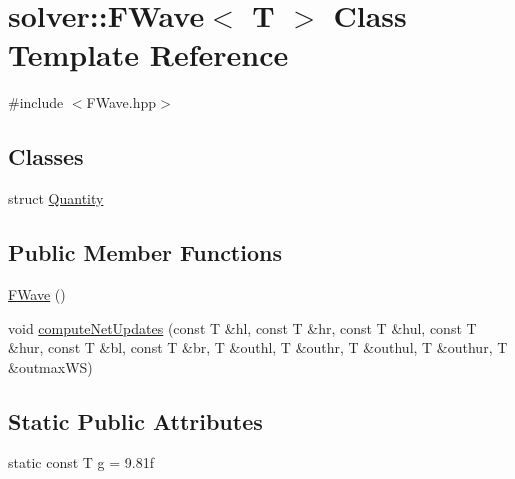\hypertarget{classsolver_1_1FWave}{}\section{solver\+:\+:F\+Wave$<$ T $>$ Class Template Reference}
\label{classsolver_1_1FWave}


{\ttfamily \#include $<$F\+Wave.\+hpp$>$}

\subsection*{Classes}
\begin{DoxyCompactItemize}
\item 
struct \hyperlink{structsolver_1_1FWave_1_1Quantity}{Quantity}
\end{DoxyCompactItemize}
\subsection*{Public Member Functions}
\begin{DoxyCompactItemize}
\item 
\hyperlink{classsolver_1_1FWave_a446e2721d799afa5612a3a2b8c30d668}{F\+Wave} ()
\item 
void \hyperlink{classsolver_1_1FWave_a2e7f623f6dc6bd74f49af17dccafd7c7}{compute\+Net\+Updates} (const T \&hl, const T \&hr, const T \&hul, const T \&hur, const T \&bl, const T \&br, T \&outhl, T \&outhr, T \&outhul, T \&outhur, T \&outmax\+W\+S)
\end{DoxyCompactItemize}
\subsection*{Static Public Attributes}
\begin{DoxyCompactItemize}
\item 
static const T \hyperlink{classsolver_1_1FWave_ac3884c16c1822530961884e9f52304a2}{g} = 9.\+81f
\end{DoxyCompactItemize}
